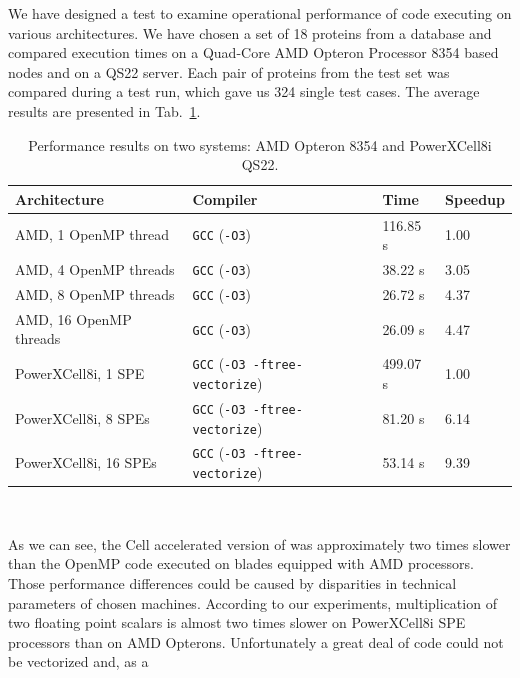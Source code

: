 We have designed a test to examine operational performance of \prog{} code
executing on various architectures.
We have chosen a set of 18 proteins from a database and compared execution times
on a Quad-Core AMD Opteron Processor 8354 based nodes and on a QS22 server.
Each pair of proteins from the test set was compared during a test run, which
gave us 324 single test cases.
The average results are presented in Tab.~\ref{tab:t4}.
\begin{table}[htb]
\begin{footnotesize}
\caption{Performance results on two systems: AMD Opteron 8354 and PowerXCell8i QS22.}
\label{tab:t4}
\newcommand{\m}{\hphantom{$-$}}
\newcommand{\cc}[1]{\multicolumn{1}{c}{#1}}
\renewcommand{\tabcolsep}{0.5pc} %
\renewcommand{\arraystretch}{1.2} %
\begin{tabular}{@{}llll}
\hline
\textbf{Architecture} & \textbf{Compiler} & \textbf{Time} & \textbf{Speedup} \\
\hline
AMD, 1 OpenMP thread & \texttt{GCC} (\texttt{-O3}) & 116.85 s & 1.00 \\
AMD, 4 OpenMP threads & \texttt{GCC} (\texttt{-O3}) & 38.22 s & 3.05 \\
AMD, 8 OpenMP threads & \texttt{GCC} (\texttt{-O3}) & 26.72 s & 4.37 \\
AMD, 16 OpenMP threads & \texttt{GCC} (\texttt{-O3}) & 26.09 s & 4.47 \\
\hline
PowerXCell8i, 1 SPE & \texttt{GCC} (\texttt{-O3 -ftree-vectorize}) & 499.07 s & 1.00 \\
PowerXCell8i, 8 SPEs & \texttt{GCC} (\texttt{-O3 -ftree-vectorize}) &  81.20 s & 6.14 \\
PowerXCell8i, 16 SPEs & \texttt{GCC} (\texttt{-O3 -ftree-vectorize}) & 53.14 s & 9.39 \\
\hline
\end{tabular}\\[2pt]
\end{footnotesize}
\end{table}
As we can see, the Cell accelerated version of \prog{} was approximately
two times slower than the OpenMP code executed on blades equipped with AMD
processors.
Those performance differences could be caused by disparities in technical
parameters of chosen machines.
According to our experiments, multiplication of two floating point scalars is
almost two times slower on PowerXCell8i SPE processors than on AMD Opterons.
Unfortunately a great deal of \prog{} code could not be vectorized and, as a

